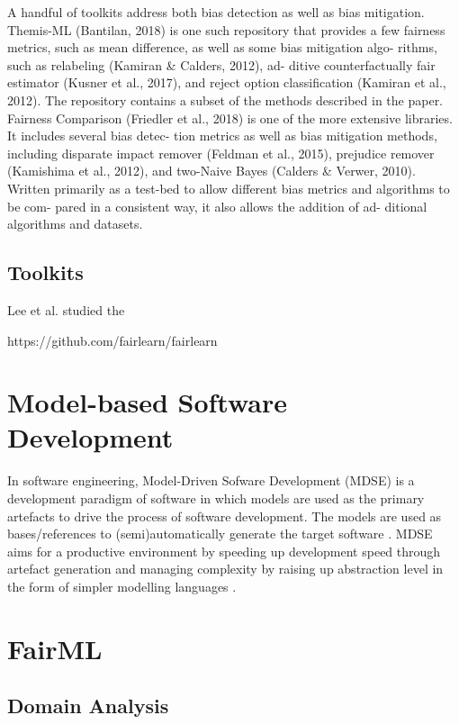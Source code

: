 \documentclass[final,5p,times,twocolumn]{elsarticle}
\begin{document}
A handful of toolkits address both bias detection as well
as bias mitigation. Themis-ML (Bantilan, 2018) is one
such repository that provides a few fairness metrics, such
as mean difference, as well as some bias mitigation algo-
rithms, such as relabeling (Kamiran \& Calders, 2012), ad-
ditive counterfactually fair estimator (Kusner et al., 2017),
and reject option classiﬁcation (Kamiran et al., 2012). The
repository contains a subset of the methods described in the
paper. Fairness Comparison (Friedler et al., 2018) is one of
the more extensive libraries. It includes several bias detec-
tion metrics as well as bias mitigation methods, including
disparate impact remover (Feldman et al., 2015), prejudice
remover (Kamishima et al., 2012), and two-Naive Bayes
(Calders \& Verwer, 2010). Written primarily as a test-bed
to allow different bias metrics and algorithms to be com-
pared in a consistent way, it also allows the addition of ad-
ditional algorithms and datasets.

\subsection{Toolkits}
\label{sec:toolkits}

Lee et al. \cite{lee2021landscape} studied the 

https://github.com/fairlearn/fairlearn

\section{Model-based Software Development}
\label{sec:model_based_software_development}
In software engineering, Model-Driven Sofware Development (MDSE) is a development paradigm of software in which models are used as the primary artefacts to drive the process of software development. The models are used as bases/references to (semi)automatically generate the target software \cite{brambilla2017model}. MDSE aims for a productive environment by speeding up development speed through artefact generation and managing complexity by raising up abstraction level in the form of simpler modelling languages \cite{volter2013model}.

\section{FairML}
\label{sec:fairml}

\subsection{Domain Analysis}
\label{sec:domain_analysis}
\end{document}
